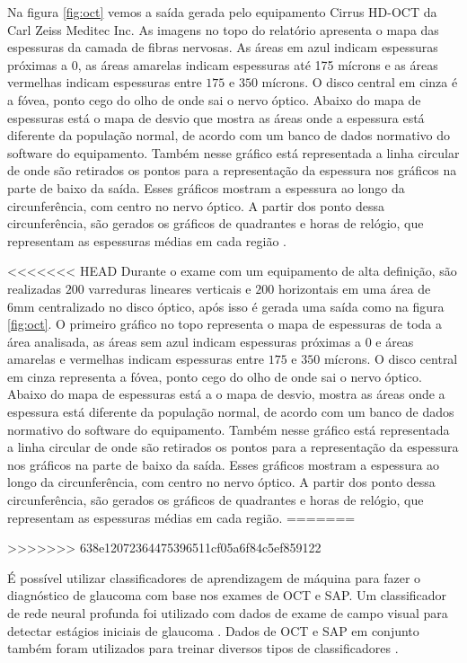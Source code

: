 \documentclass[conference]{IEEEtran}
\begin{document}
Na figura \ref{fig:oct} vemos a saída gerada pelo equipamento Cirrus HD-OCT da Carl Zeiss Meditec Inc. As imagens no topo do relatório apresenta o mapa das espessuras da camada de fibras nervosas. As áreas em azul indicam espessuras próximas a $0$, as áreas amarelas indicam espessuras até 175 mícrons e as áreas vermelhas indicam espessuras entre $175$ e $350$ mícrons. O disco central em cinza é a fóvea, ponto cego do olho de onde sai o nervo óptico. Abaixo do mapa de espessuras está o mapa de desvio que mostra as áreas onde a espessura está diferente da população normal, de acordo com um banco de dados normativo do software do equipamento. Também nesse gráfico está representada a linha circular de onde são retirados os pontos para a representação da espessura nos gráficos na parte de baixo da saída. Esses gráficos mostram a espessura ao longo da circunferência, com centro no nervo óptico. A partir dos ponto dessa circunferência, são gerados os gráficos de quadrantes e horas de relógio, que representam as espessuras médias em cada região \cite{Populacoes2009}.

<<<<<<< HEAD
Durante o exame com um equipamento de alta definição, são realizadas $200$ varreduras lineares verticais e $200$ horizontais em uma área de 6mm centralizado no disco óptico, após isso é gerada uma saída como na figura \ref{fig:oct}. O primeiro gráfico no topo representa o mapa de espessuras de toda a área analisada, as áreas sem azul indicam espessuras próximas a $0$ e áreas amarelas e vermelhas indicam espessuras entre $175$ e $350$ mícrons. O disco central em cinza representa a fóvea, ponto cego do olho de onde sai o nervo óptico. Abaixo do mapa de espessuras está a o mapa de desvio, mostra as áreas onde a espessura está diferente da população normal, de acordo com um banco de dados normativo do software do equipamento. Também nesse gráfico está representada a linha circular de onde são retirados os pontos para a representação da espessura nos gráficos na parte de baixo da saída. Esses gráficos mostram a espessura ao longo da circunferência, com centro no nervo óptico. A partir dos ponto dessa circunferência, são gerados os gráficos de quadrantes e horas de relógio, que representam as espessuras médias em cada região.
=======

>>>>>>> 638e12072364475396511cf05a6f84c5ef859122

É possível utilizar classificadores de aprendizagem de máquina para fazer o diagnóstico de glaucoma com base nos exames de OCT e SAP. Um classificador de rede neural profunda foi utilizado com dados de exame de campo visual para detectar estágios iniciais de glaucoma \cite{Asaoka2016}. Dados de OCT e SAP em conjunto também foram utilizados para treinar diversos tipos de classificadores \cite{Populacoes2009,bowd2008}. %
\end{document}

